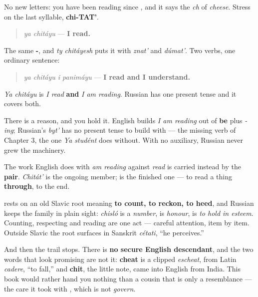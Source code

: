 No new letters: \textbf{} you have been reading since \emph{}, and it says the \emph{ch} of \emph{cheese}. Stress on the last syllable, \textbf{chi-TAT'}.

\begin{quote}
\emph{ya chitáyu} — \textbf{I read.}
\end{quote}

The same \textbf{-}, and \emph{ty chitáyesh} puts it with \emph{znat'} and \emph{dúmat'}. Two verbs, one ordinary sentence:

\begin{quote}
\emph{ya chitáyu i panimáyu} — \textbf{I read and I understand.}
\end{quote}

\begin{grammarlens}[title={Grammar Lens: one present tense, two English sentences}]
\emph{Ya chitáyu} is \emph{I read} \textbf{and} \emph{I am reading}. Russian has one present tense and it covers both.

There is a reason, and you hold it. English builds \emph{I am reading} out of \textbf{be} plus \emph{-ing}; Russian's \emph{byt'} has no present tense to build with — the missing verb of Chapter 3, the one \emph{Ya studént} does without. With no auxiliary, Russian never grew the machinery.

The work English does with \emph{am reading} against \emph{read} is carried instead by the \textbf{pair}. \emph{Chitát'} is the ongoing member; \textbf{} is the finished one — to read a thing \textbf{through}, to the end.
\end{grammarlens}

\begin{cousinweb}
\textbf{} rests on an old Slavic root meaning \textbf{to count, to reckon, to heed}, and Russian keeps the family in plain sight: \emph{chisló} is a \emph{number}, \textbf{} is \emph{honour}, \textbf{} is \emph{to hold in esteem}. Counting, respecting and reading are one act — careful attention, item by item. Outside Slavic the root surfaces in Sanskrit \emph{cétati}, \textquotedblleft{}he perceives.\textquotedblright{}

And then the trail stops. There is \textbf{no secure English descendant}, and the two words that look promising are not it: \textbf{cheat} is a clipped \emph{escheat}, from Latin \emph{cadere}, \textquotedblleft{}to fall,\textquotedblright{} and \textbf{chit}, the little note, came into English from India. This book would rather hand you nothing than a cousin that is only a resemblance — the care it took with \emph{}, which is not \emph{govern}.
\end{cousinweb}

